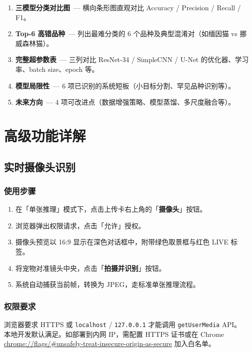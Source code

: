 \documentclass[12pt, a4paper, openany]{ctexbook}
\begin{document}
\begin{enumerate}[leftmargin=*]
  \item \textbf{三模型分类对比图}\ — 横向条形图直观对比 Accuracy / Precision / Recall / F1。
  \item \textbf{Top-6 高错品种}\ — 列出最难分类的 6 个品种及典型混淆对（如缅因猫 vs 挪威森林猫）。
  \item \textbf{完整超参数表}\ — 三列对比 ResNet-34 / SimpleCNN / U-Net 的优化器、学习率、batch size、epoch 等。
  \item \textbf{模型局限性}\ — 6 项已识别的系统短板（小目标分割、罕见品种识别等）。
  \item \textbf{未来方向}\ — 4 项可改进点（数据增强策略、模型蒸馏、多尺度融合等）。
\end{enumerate}

\chapter{高级功能详解}

\section{实时摄像头识别}

\subsection{使用步骤}

\begin{enumerate}
  \item 在「单张推理」模式下，点击上传卡右上角的「\textbf{摄像头}」按钮。
  \item 浏览器弹出权限请求，点击「允许」授权。
  \item 摄像头预览以 16:9 显示在深色对话框中，附带绿色取景框与红色 LIVE 标签。
  \item 将宠物对准镜头中央，点击「\textbf{拍摄并识别}」按钮。
  \item 系统自动捕获当前帧，转换为 JPEG，走标准单张推理流程。
\end{enumerate}

\subsection{权限要求}

\begin{warnbox}
浏览器要求 HTTPS 或 \texttt{localhost} / \texttt{127.0.0.1} 才能调用 \texttt{getUserMedia} API。
本地开发默认满足。如部署到内网 IP，需配置 HTTPS 证书或在 Chrome
\url{chrome://flags/\#unsafely-treat-insecure-origin-as-secure} 加入白名单。
\end{warnbox}
\end{document}
